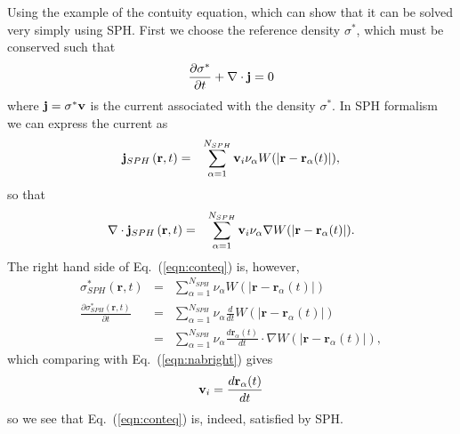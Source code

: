 \documentclass[aps,article]{revtex4}
\begin{document}
Using the example of the contuity equation, which can show that it can be solved very simply using SPH.
First we choose the reference density $\sigma^*$, which must be conserved such that
\begin{equation}\label{eqn:conteq}
\frac{\partial\sigma^*}{\partial t}+\nabla\cdot{\bf j}=0
\end{equation}
where ${\bf j}=\sigma^*{\bf v}$ is the current associated with the density $\sigma^*$. In SPH formalism we can express the current as 
\begin{eqnarray}
\mathbf{j}_{SPH}\left( \mathbf{r},t\right) &=&\sum_{\alpha =1}^{N_{SPH}}{\bf v}_i\nu
_{\alpha }W(|\mathbf{r}-\mathbf{r}%
_{\alpha }(t)|),
\end{eqnarray}
so that
\begin{eqnarray}
\nabla\cdot\mathbf{j}_{SPH}\left( \mathbf{r},t\right) &=&\sum_{\alpha =1}^{N_{SPH}}{\bf v}_i\nu
_{\alpha }\nabla W(|\mathbf{r}-\mathbf{r}%
_{\alpha }(t)|).\label{eqn:nabright}
\end{eqnarray}
The right hand side of Eq.\ (\ref{eqn:conteq}) is, however,
\begin{eqnarray}
\sigma _{SPH}^{\ast }\left( \mathbf{r},t\right)& =&\sum_{\alpha
=1}^{N_{SPH}}\nu _{\alpha }W(|\mathbf{r}-\mathbf{r}_{\alpha }(t)|)\label{eqn:sigmasph}\\
\frac{\partial\sigma _{SPH}^{\ast }\left( \mathbf{r},t\right)}{\partial t}& =&\sum_{\alpha
=1}^{N_{SPH}}\nu _{\alpha }\frac{d}{dt}W(|\mathbf{r}-\mathbf{r}_{\alpha }(t)|)\nonumber\\
& =&\sum_{\alpha
=1}^{N_{SPH}}\nu _{\alpha }\frac{d\mathbf{r}_{\alpha }(t)}{dt}\cdot\nabla W(|\mathbf{r}-\mathbf{r}_{\alpha }(t)|),
\end{eqnarray}
which comparing with Eq.\ (\ref{eqn:nabright}) gives
\begin{equation}
{\bf v}_i=\frac{d\mathbf{r}_{\alpha }(t)}{dt}
\end{equation}
so we see that Eq.\ (\ref{eqn:conteq}) is, indeed, satisfied by SPH.
\end{document}
